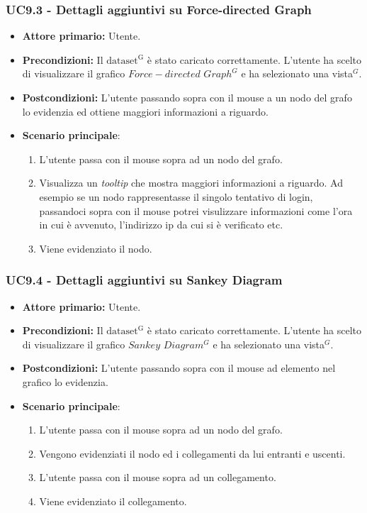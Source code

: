 \subsubsection{UC9.3 - Dettagli aggiuntivi su Force-directed Graph}
\label{sec:UC9.3}
\begin{itemize}
    \item \textbf{Attore primario:} Utente.
    \item \textbf{Precondizioni:} Il ${\mathrm{dataset^{G}}}$ è stato caricato correttamente. L'utente ha scelto di visualizzare il grafico $Force-directed$ $Graph^{G}$ e ha selezionato una vista$^{G}$.
    \item \textbf{Postcondizioni:} L'utente passando sopra con il mouse a un nodo del grafo lo evidenzia ed ottiene maggiori informazioni a riguardo.
    \item \textbf{Scenario principale}:
    \begin{enumerate}
		\item L'utente passa con il mouse sopra ad un nodo del grafo.
		\item Visualizza un \textit{tooltip} che mostra maggiori informazioni a riguardo. Ad esempio se un nodo rappresentasse il singolo tentativo di login, passandoci sopra con il mouse potrei visulizzare informazioni come l'ora in cui è avvenuto, l'indirizzo ip da cui si è verificato etc.
		\item Viene evidenziato il nodo.
	\end{enumerate}
\end{itemize}

\subsubsection{UC9.4 - Dettagli aggiuntivi su Sankey Diagram}
\label{sec:UC9.4}
\begin{itemize}
    \item \textbf{Attore primario:} Utente.
    \item \textbf{Precondizioni:} Il ${\mathrm{dataset^{G}}}$ è stato caricato correttamente. L'utente ha scelto di visualizzare il grafico $Sankey$ $Diagram^{G}$ e ha selezionato una vista$^{G}$.
    \item \textbf{Postcondizioni:} L'utente passando sopra con il mouse ad elemento nel grafico lo evidenzia.
    \item \textbf{Scenario principale}: 
    \begin{enumerate}
		\item L'utente passa con il mouse sopra ad un nodo del grafo.
		\item Vengono evidenziati il nodo ed i collegamenti da lui entranti e uscenti.
		\item L'utente passa con il mouse sopra ad un collegamento.
		\item Viene evidenziato il collegamento.
	\end{enumerate}
\end{itemize}

